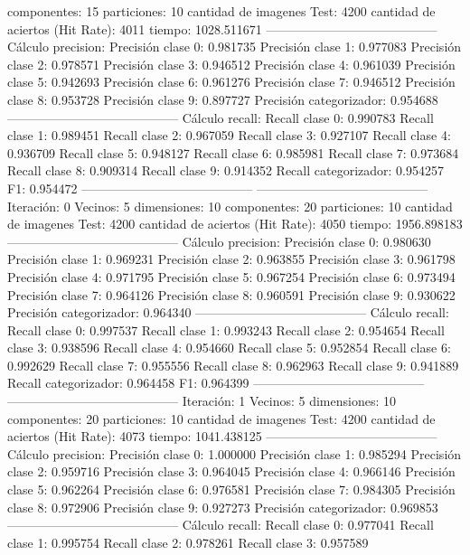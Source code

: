 componentes: 15
particiones: 10
cantidad de imagenes Test: 4200
cantidad de aciertos (Hit Rate): 4011
tiempo: 1028.511671
-----------------------------------------
Cálculo precision: 
Precisión clase 0: 0.981735
Precisión clase 1: 0.977083
Precisión clase 2: 0.978571
Precisión clase 3: 0.946512
Precisión clase 4: 0.961039
Precisión clase 5: 0.942693
Precisión clase 6: 0.961276
Precisión clase 7: 0.946512
Precisión clase 8: 0.953728
Precisión clase 9: 0.897727
Precisión categorizador: 0.954688
-----------------------------------------
Cálculo recall: 
Recall clase 0: 0.990783
Recall clase 1: 0.989451
Recall clase 2: 0.967059
Recall clase 3: 0.927107
Recall clase 4: 0.936709
Recall clase 5: 0.948127
Recall clase 6: 0.985981
Recall clase 7: 0.973684
Recall clase 8: 0.909314
Recall clase 9: 0.914352
Recall categorizador: 0.954257
F1: 0.954472
-----------------------------------------
-----------------------------------------
Iteración: 0
Vecinos: 5
dimensiones: 10
componentes: 20
particiones: 10
cantidad de imagenes Test: 4200
cantidad de aciertos (Hit Rate): 4050
tiempo: 1956.898183
-----------------------------------------
Cálculo precision: 
Precisión clase 0: 0.980630
Precisión clase 1: 0.969231
Precisión clase 2: 0.963855
Precisión clase 3: 0.961798
Precisión clase 4: 0.971795
Precisión clase 5: 0.967254
Precisión clase 6: 0.973494
Precisión clase 7: 0.964126
Precisión clase 8: 0.960591
Precisión clase 9: 0.930622
Precisión categorizador: 0.964340
-----------------------------------------
Cálculo recall: 
Recall clase 0: 0.997537
Recall clase 1: 0.993243
Recall clase 2: 0.954654
Recall clase 3: 0.938596
Recall clase 4: 0.954660
Recall clase 5: 0.952854
Recall clase 6: 0.992629
Recall clase 7: 0.955556
Recall clase 8: 0.962963
Recall clase 9: 0.941889
Recall categorizador: 0.964458
F1: 0.964399
-----------------------------------------
-----------------------------------------
Iteración: 1
Vecinos: 5
dimensiones: 10
componentes: 20
particiones: 10
cantidad de imagenes Test: 4200
cantidad de aciertos (Hit Rate): 4073
tiempo: 1041.438125
-----------------------------------------
Cálculo precision: 
Precisión clase 0: 1.000000
Precisión clase 1: 0.985294
Precisión clase 2: 0.959716
Precisión clase 3: 0.964045
Precisión clase 4: 0.966146
Precisión clase 5: 0.962264
Precisión clase 6: 0.976581
Precisión clase 7: 0.984305
Precisión clase 8: 0.972906
Precisión clase 9: 0.927273
Precisión categorizador: 0.969853
-----------------------------------------
Cálculo recall: 
Recall clase 0: 0.977041
Recall clase 1: 0.995754
Recall clase 2: 0.978261
Recall clase 3: 0.957589
